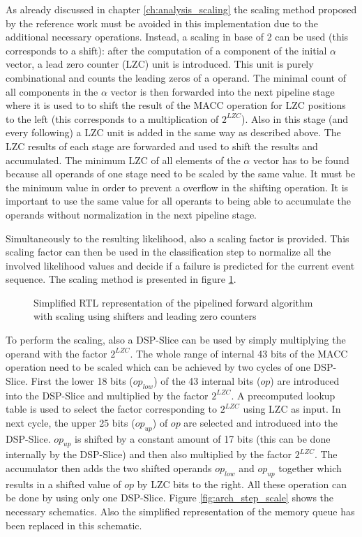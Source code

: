 \documentclass[mscthesis]{usiinfthesis}
\begin{document}
As already discussed in chapter \ref{ch:analysis_scaling} the scaling method
proposed by the reference work must be avoided in this implementation due to
the additional necessary operations. Instead, a scaling in base of 2 can be
used (this corresponds to a shift): after the computation of a component of the
initial $\alpha$ vector, a lead zero counter (LZC) unit is introduced. This
unit is purely combinational and counts the leading zeros of a operand. The
minimal count of all components in the $\alpha$ vector is then forwarded into
the next pipeline stage where it is used to to shift the result of the MACC
operation for LZC positions to the left (this corresponds to a multiplication
of $2^{LZC}$). Also in this stage (and every following) a LZC unit is added in
the same way as described above. The LZC results of each stage are forwarded
and used to shift the results and accumulated. The minimum LZC of all elements
of the $\alpha$ vector has to be found because all operands of one stage need
to be scaled by the same value. It must be the minimum value in order to
prevent a overflow in the shifting operation. It is important to use the same
value for all operants to being able to accumulate the operands without
normalization in the next pipeline stage.

Simultaneously to the resulting likelihood, also a scaling factor is provided.
This scaling factor can then be used in the classification step to normalize
all the involved likelihood values and decide if a failure is predicted for the
current event sequence. The scaling method is presented in figure
\ref{fig:arch_pipe_scale}.

\begin{figure}
    \centering
    
    \caption{Simplified RTL representation of the pipelined forward algorithm
        with scaling using shifters and leading zero counters}
    \label{fig:arch_pipe_scale}
\end{figure}

To perform the scaling, also a DSP-Slice can be used by simply multiplying the
operand with the factor $2^{LZC}$. The whole range of internal 43 bits of the
MACC operation need to be scaled which can be achieved by two cycles of one
DSP-Slice. First the lower 18 bits ($op_{low}$) of the 43 internal bits ($op$)
are introduced into the DSP-Slice and multiplied by the factor $2^{LZC}$.
A precomputed lookup table is used to select the factor corresponding to
$2^{LZC}$ using LZC as input. In next cycle, the upper 25 bits ($op_{up}$) of
$op$ are selected and introduced into the DSP-Slice. $op_{up}$ is shifted by
a constant amount of 17 bits (this can be done internally by the DSP-Slice) and
then also multiplied by the factor $2^{LZC}$. The accumulator then adds the two
shifted operands $op_{low}$ and $op_{up}$ together which results in a shifted
value of $op$ by LZC bits to the right. All these operation can be done by
using only one DSP-Slice. Figure \ref{fig:arch_step_scale} shows the necessary
schematics. Also the simplified representation of the memory queue has been
replaced in this schematic.
\end{document}
